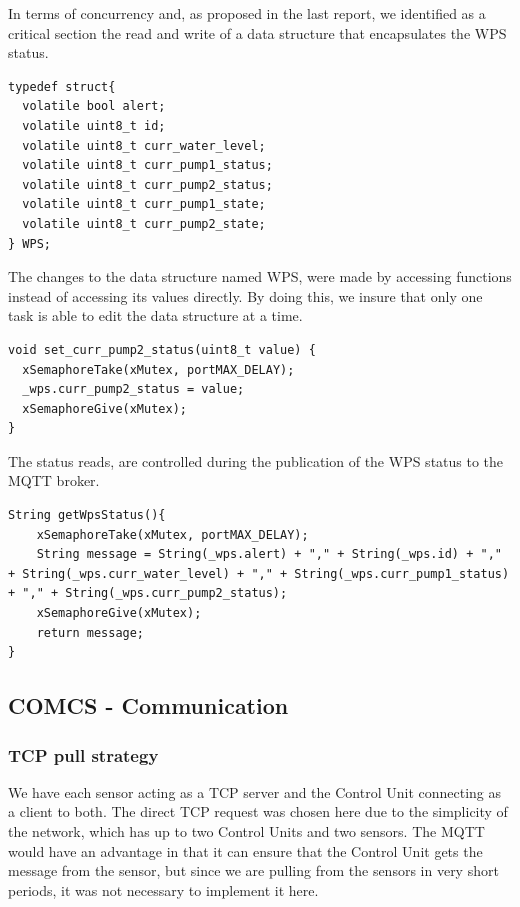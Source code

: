 \documentclass[11pt]{article}
\begin{document}
In terms of concurrency and, as proposed in the last report, we identified as a critical section the read and write of a data structure that encapsulates the WPS status.

\begin{verbatim}
typedef struct{
  volatile bool alert;
  volatile uint8_t id;
  volatile uint8_t curr_water_level;
  volatile uint8_t curr_pump1_status;
  volatile uint8_t curr_pump2_status;  
  volatile uint8_t curr_pump1_state;
  volatile uint8_t curr_pump2_state;
} WPS;
\end{verbatim}

The changes to the data structure named WPS, were made by accessing functions instead of accessing its values directly. By doing this, we insure that only one task is able to edit the data structure at a time.

\begin{verbatim}
void set_curr_pump2_status(uint8_t value) {
  xSemaphoreTake(xMutex, portMAX_DELAY);
  _wps.curr_pump2_status = value;
  xSemaphoreGive(xMutex);
}
\end{verbatim}

The status reads, are controlled during the publication of the WPS status to the MQTT broker.

\begin{verbatim}
String getWpsStatus(){
    xSemaphoreTake(xMutex, portMAX_DELAY);
    String message = String(_wps.alert) + "," + String(_wps.id) + "," + String(_wps.curr_water_level) + "," + String(_wps.curr_pump1_status) + "," + String(_wps.curr_pump2_status);
    xSemaphoreGive(xMutex);
    return message;
}
\end{verbatim}

\subsection{COMCS - Communication}

\subsubsection{TCP pull strategy}

We have each sensor acting as a TCP server and the Control Unit connecting as a client to both.
The direct TCP request was chosen here due to the simplicity of the network, which has up to two Control Units and two sensors. The MQTT would have an advantage in that it can ensure that the Control Unit gets the message from the sensor, but since we are pulling from the sensors in very short periods, it was not necessary to implement it here.
\end{document}
